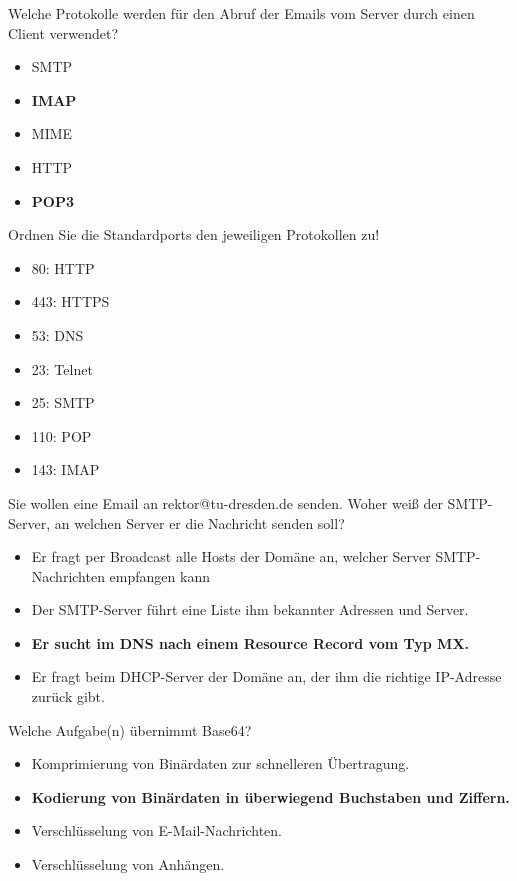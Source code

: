 \documentclass{article}
\begin{document}
	Welche Protokolle werden für den Abruf der Emails vom Server durch einen Client verwendet? 
	\begin{itemize}
		\item SMTP
		\item \textbf{IMAP}
		\item MIME
		\item HTTP
		\item \textbf{POP3}
	\end{itemize}

	Ordnen Sie die Standardports den jeweiligen Protokollen zu! 
	\begin{itemize}
		\item 80: HTTP
		\item 443: HTTPS
		\item 53: DNS
		\item 23: Telnet
		\item 25: SMTP
		\item 110: POP
		\item 143: IMAP
	\end{itemize}

	Sie wollen eine Email an rektor@tu-dresden.de senden. Woher weiß der SMTP-Server, an welchen Server er die Nachricht senden soll?
	\begin{itemize}
		\item Er fragt per Broadcast alle Hosts der Domäne an, welcher Server SMTP-Nachrichten empfangen kann 
		\item Der SMTP-Server führt eine Liste ihm bekannter Adressen und Server. 
		\item \textbf{Er sucht im DNS nach einem Resource Record vom Typ MX. }
		\item Er fragt beim DHCP-Server der Domäne an, der ihm die richtige IP-Adresse zurück gibt. 
	\end{itemize}

	Welche Aufgabe(n) übernimmt Base64? 
	\begin{itemize}
		\item Komprimierung von Binärdaten zur schnelleren Übertragung. 
		\item \textbf{Kodierung von Binärdaten in überwiegend Buchstaben und Ziffern. }
		\item Verschlüsselung von E-Mail-Nachrichten. 
		\item Verschlüsselung von Anhängen.
	\end{itemize}
\end{document}
